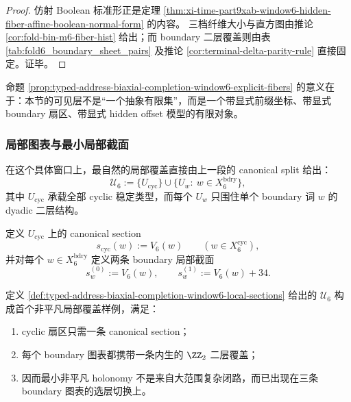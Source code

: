\begin{proof}
仿射 Boolean 标准形正是定理 \ref{thm:xi-time-part9xab-window6-hidden-fiber-affine-boolean-normal-form} 的内容。
三档纤维大小与直方图由推论 \ref{cor:fold-bin-m6-fiber-hist} 给出；而 boundary 二层覆盖则由表 \ref{tab:fold6_boundary_sheet_pairs} 及推论 \ref{cor:terminal-delta-parity-rule} 直接固定。证毕。
\end{proof}

命题 \ref{prop:typed-address-biaxial-completion-window6-explicit-fibers} 的意义在于：本节的可见层不是“一个抽象有限集”，而是一个带显式前缀坐标、带显式 boundary 扇区、带显式 hidden offset 模型的有限对象。

\subsubsection{局部图表与最小局部截面}\label{subsubsec:typed-address-biaxial-completion-window6-local-charts}
在这个具体窗口上，最自然的局部覆盖直接由上一段的 canonical split 给出：
\[
\mathcal U_6:=\{U_{\mathrm{cyc}}\}\cup \{U_w:\ w\in X_6^{\mathrm{bdry}}\},
\]
其中 \(U_{\mathrm{cyc}}\) 承载全部 cyclic 稳定类型，而每个 \(U_w\) 只围住单个 boundary 词 \(w\) 的 dyadic 二层结构。

\begin{definition}\label{def:typed-address-biaxial-completion-window6-local-sections}
定义 \(U_{\mathrm{cyc}}\) 上的 canonical section
\[
s_{\mathrm{cyc}}(w):=V_6(w)
\qquad (w\in X_6^{\mathrm{cyc}}),
\]
并对每个 \(w\in X_6^{\mathrm{bdry}}\) 定义两条 boundary 局部截面
\[
s_w^{(0)}:=V_6(w),
\qquad
s_w^{(1)}:=V_6(w)+34.
\]
\end{definition}

\begin{proposition}\label{prop:typed-address-biaxial-completion-window6-two-sheet-charts}
定义 \ref{def:typed-address-biaxial-completion-window6-local-sections} 给出的 \(\mathcal U_6\) 构成首个非平凡局部覆盖样例，满足：
\begin{enumerate}
  \item cyclic 扇区只需一条 canonical section；
  \item 每个 boundary 图表都携带一条内生的 \(\ZZ_2\) 二层覆盖；
  \item 因而最小非平凡 holonomy 不是来自大范围复杂闭路，而已出现在三条 boundary 图表的选层切换上。
\end{enumerate}
\end{proposition}

